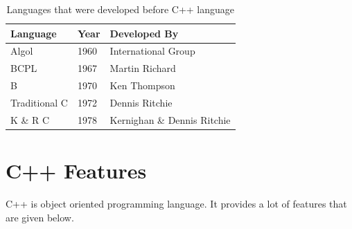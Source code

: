 \documentclass{book}
\begin{document}
\begin{table}[h]
\centering
\begin{tabular}{lll} \hline 
Language	& Year	& Developed By \\ \hline
Algol	& 1960	& International Group \\
BCPL	& 1967	& Martin Richard \\
B	& 1970	& Ken Thompson \\
Traditional C	& 1972	& Dennis Ritchie \\
K \& R C	& 1978	& Kernighan \& Dennis Ritchie \\ \hline 

\end{tabular}
\caption{Languages that were developed before C++ language}
\label{}
\end{table}

\section{C++ Features}

C++ is object oriented programming language. It provides a lot of features that are given below.

\end{document}
